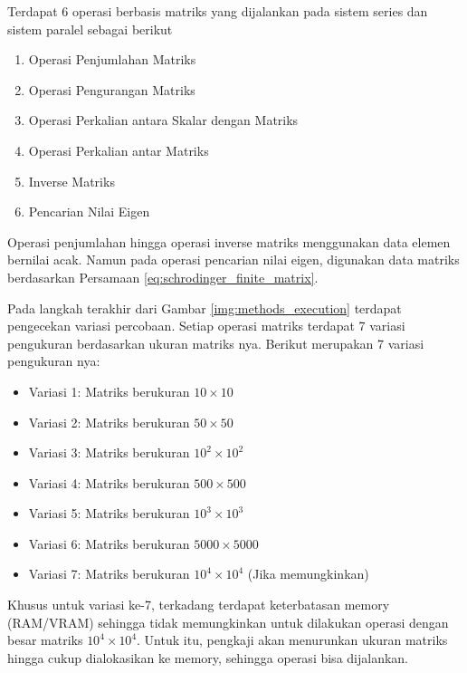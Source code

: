 Terdapat 6 operasi berbasis matriks yang dijalankan pada sistem series dan
sistem paralel sebagai berikut

\begin{enumerate}
  \item Operasi Penjumlahan Matriks
  \item Operasi Pengurangan Matriks
  \item Operasi Perkalian antara Skalar dengan Matriks
  \item Operasi Perkalian antar Matriks
  \item Inverse Matriks
  \item Pencarian Nilai Eigen
\end{enumerate}

\noindent
Operasi penjumlahan hingga operasi inverse matriks menggunakan data elemen bernilai acak. Namun pada operasi pencarian nilai eigen, digunakan data matriks berdasarkan Persamaan \ref{eq:schrodinger_finite_matrix}.

Pada langkah terakhir dari Gambar \ref{img:methods_execution} terdapat
pengecekan variasi percobaan. Setiap operasi matriks terdapat 7 variasi
pengukuran berdasarkan ukuran matriks nya. Berikut merupakan 7 variasi
pengukuran nya:

\begin{itemize}
  \item Variasi 1: Matriks berukuran $10 \times 10$
  \item Variasi 2: Matriks berukuran $50 \times 50$
  \item Variasi 3: Matriks berukuran $10^2 \times 10^2$
  \item Variasi 4: Matriks berukuran $500 \times 500$
  \item Variasi 5: Matriks berukuran $10^3 \times 10^3$
  \item Variasi 6: Matriks berukuran $5000 \times 5000$
  \item Variasi 7: Matriks berukuran $10^4 \times 10^4$ (Jika memungkinkan)
\end{itemize}

\noindent
Khusus untuk variasi ke-7, terkadang terdapat keterbatasan memory (RAM/VRAM) sehingga tidak memungkinkan untuk dilakukan operasi dengan besar matriks $10^4 \times 10^4$. Untuk itu, pengkaji akan menurunkan ukuran matriks hingga cukup dialokasikan ke memory, sehingga operasi bisa dijalankan.

